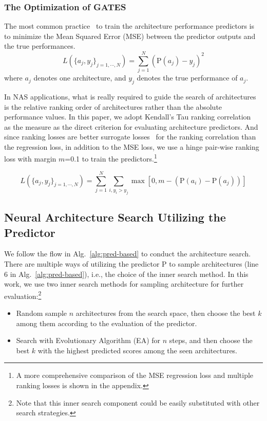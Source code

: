 \documentclass[runningheads]{llncs}
\begin{document}
\subsubsection{The Optimization of GATES}


The most common practice~\cite{liu2018progressive,nao2018} to train the architecture performance predictors is to minimize the Mean Squared Error (MSE) between the predictor outputs and the true performances.
\begin{equation}
  L(\{a_j, y_j\}_{j=1,\cdots,N}) = \sum_{j=1}^N(\mbox{P}(a_j) - y_j)^2
\end{equation}
where $a_j$ denotes one architecture, and $y_j$ denotes the true performance of $a_j$.


In NAS applications, what is really required to guide the search of architectures is the relative ranking order of architectures rather than the absolute performance values. In this paper, we adopt Kendall's Tau ranking correlation~\cite{sen1968estimates} as the measure as the direct criterion for evaluating architecture predictors. And since ranking losses are better surrogate losses~\cite{chen2009,liu2009learning,xu2019renas} for the ranking correlation than the regression loss, 
in addition to the MSE loss,
we use a hinge pair-wise ranking loss with margin $m$=0.1 to train the predictors.\footnote{A more comprehensive comparison of the MSE regression loss and multiple ranking losses is shown in the appendix.}

\begin{equation}
  L(\{a_j, y_j\}_{j=1,\cdots,N}) = \sum_{j=1}^N\sum_{i, y_i > y_j} \max[0, m - (\mbox{P}(a_i) - \mbox{P}(a_j))]
\end{equation}


\subsection{Neural Architecture Search Utilizing the Predictor}
\label{sec:method-nas}


We follow the flow in Alg.~\ref{alg:pred-based} to conduct the architecture search. There are multiple ways of utilizing the predictor $\mbox{P}$ to sample architectures (line 6 in Alg.~\ref{alg:pred-based}), i.e., the choice of the inner search method. In this work, we use two inner search methods for sampling architecture for further evaluation:\footnote{Note that this inner search component could be easily substituted with other search strategies.}
\begin{itemize}
    \item Random sample $n$ architectures from the search space, then choose the best $k$ among them according to the evaluation of the predictor.

    \item Search with Evolutionary Algorithm (EA) for $n$ steps, and then choose the best $k$ with the highest predicted scores among the seen architectures.

\end{itemize}
\end{document}
